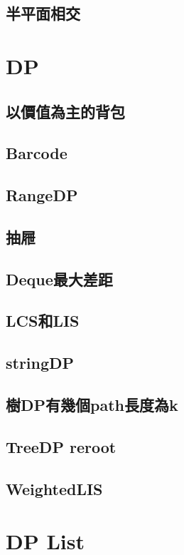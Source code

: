     \subsection{半平面相交}
        
\clearpage

\section{DP}
    \subsection{以價值為主的背包}
        
    \subsection{Barcode}
        
    \subsection{RangeDP}
        
    \subsection{抽屜}
        
    \subsection{Deque最大差距}
        
    \subsection{LCS和LIS}
        
    \subsection{stringDP}
        
    \subsection{樹DP有幾個path長度為k}
        
    \subsection{TreeDP reroot}
         \columnbreak
    \subsection{WeightedLIS}
        
\clearpage

\section{DP List}
    
    

%         
